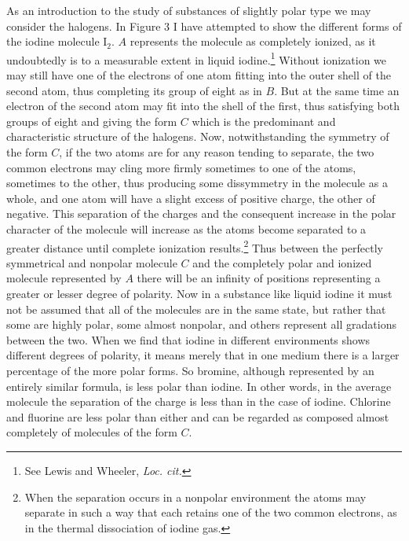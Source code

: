 \documentclass[11pt]{memoir}
\begin{document}
As an introduction to the study of substances of slightly polar type we may consider the halogens.  In Figure 3 I have attempted to show the different forms of the iodine molecule $\mathrm{I_2}$.  $A$ represents the molecule as completely ionized, as it undoubtedly is to a measurable extent in liquid iodine.\footnote{See Lewis and Wheeler, \emph{Loc. cit.}}  Without ionization we may still have one of the electrons of one atom fitting into the outer shell of the second atom, thus completing its group of eight as in $B$.  But at the same time an electron of the second atom may fit into the shell of the first, thus satisfying both groups of eight and giving the form $C$ which is the predominant and characteristic structure of the halogens.  Now, notwithstanding the symmetry of the form $C$, if the two atoms are for any reason tending to separate, the two common electrons may cling more firmly sometimes to one of the atoms, sometimes to the other, thus producing some dissymmetry in the molecule as a whole, and one atom will have a slight excess of positive charge, the other of negative.  This separation of the charges and the consequent increase in the polar character of the molecule will increase as the atoms become separated to a greater distance until complete ionization results.\footnote{When the separation occurs in a nonpolar environment the atoms may separate in such a way that each retains one of the two common electrons, as in the thermal dissociation of iodine gas.}  Thus between the perfectly symmetrical and nonpolar molecule $C$ and the completely polar and ionized molecule represented by $A$ there will be an infinity of positions representing a greater or lesser degree of polarity.  Now in a substance like liquid iodine it must not be assumed that all of the molecules are in the same state, but rather that some are highly polar, some almost nonpolar, and others represent all gradations between the two.  When we find that iodine in different environments shows different degrees of polarity, it means merely that in one medium there is a larger percentage of the more polar forms.  So bromine, although represented by an entirely similar formula, is less polar than iodine.  In other words, in the average molecule the separation of the charge is less than in the case of iodine.  Chlorine and fluorine are less polar than either and can be regarded as composed almost completely of molecules of the form $C$.
\end{document}
